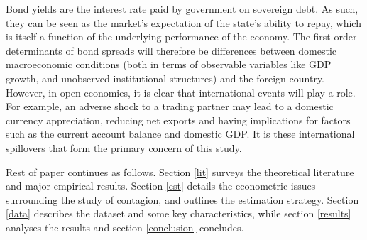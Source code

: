 \documentclass[/../base.tex]{subfiles}
\begin{document}
Bond yields are the interest rate paid by government on sovereign debt. As such, they can be seen as the market's expectation of the state's ability to repay, which is itself a function of the underlying performance of the economy. The first order determinants of bond spreads will therefore be differences between domestic macroeconomic conditions (both in terms of observable variables like GDP growth, and unobserved institutional structures) and the foreign country. However, in open economies, it is clear that international events will play a role. For example, an adverse shock to a trading partner may lead to a domestic currency appreciation, reducing net exports and having implications for factors such as the current account balance and domestic GDP. It is these international spillovers that form the primary concern of this study. 

Rest of paper continues as follows. Section \ref{lit} surveys the theoretical literature and major empirical results. Section \ref{est} details the econometric issues surrounding the study of contagion, and outlines the estimation strategy. Section \ref{data} describes the dataset and some key characteristics, while section \ref{results} analyses the results and section \ref{conclusion} concludes.
\end{document}
